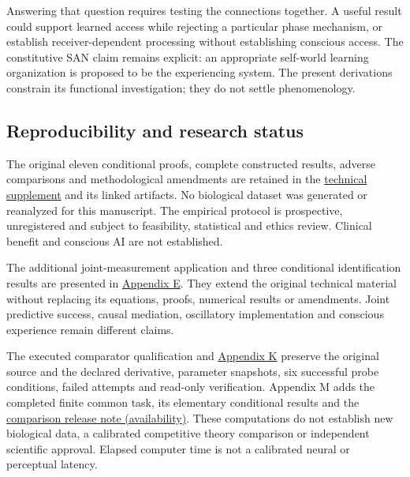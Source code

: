 \documentclass[
  american,
  11pt,
  letterpaper,
]{article}
\begin{document}
Answering that question requires testing the connections together. A useful result could support learned access while rejecting a particular phase mechanism, or establish receiver-dependent processing without establishing conscious access. The constitutive SAN claim remains explicit: an appropriate self-world learning organization is proposed to be the experiencing system. The present derivations constrain its functional investigation; they do not settle phenomenology.

\subsection{Reproducibility and research status}\label{reproducibility-and-research-status}

The original eleven conditional proofs, complete constructed results, adverse comparisons and methodological amendments are retained in the \href{https://zenodo.org/records/23455801/files/Learning-to-Feel-Technical-Supplement-v1.1.pdf}{technical supplement} and its linked artifacts. No biological dataset was generated or reanalyzed for this manuscript. The empirical protocol is prospective, unregistered and subject to feasibility, statistical and ethics review. Clinical benefit and conscious AI are not established.

The additional joint-measurement application and three conditional identification results are presented in \href{https://zenodo.org/records/23455801/files/Learning-to-Feel-Technical-Supplement-v1.1.pdf\#appendix-e}{Appendix E}. They extend the original technical material without replacing its equations, proofs, numerical results or amendments. Joint predictive success, causal mediation, oscillatory implementation and conscious experience remain different claims.

The executed comparator qualification and \href{https://zenodo.org/records/23455801/files/Learning-to-Feel-Technical-Supplement-v1.1.pdf\#appendix-k}{Appendix K} preserve the original source and the declared derivative, parameter snapshots, six successful probe conditions, failed attempts and read-only verification. Appendix M adds the completed finite common task, its elementary conditional results and the \href{https://github.com/v5ma/v5ma.github.io/blob/master/papers/companions/learning-to-feel-v1.0/ARTIFACT-AVAILABILITY.md\#artifact-36}{comparison release note (availability)}. These computations do not establish new biological data, a calibrated competitive theory comparison or independent scientific approval. Elapsed computer time is not a calibrated neural or perceptual latency.
\end{document}

